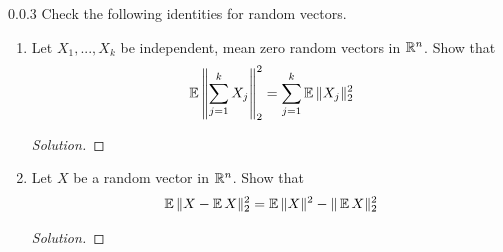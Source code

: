 \begin{ex}{0.0.3}\label{0.0.3} Check the following identities for random vectors.
\begin{enumerate}[label=(\alph*)]
\item Let $X_1,...,X_k$ be independent, mean zero random vectors in $\mathbb{R}^n$. Show that
\begin{align*}
    \operatorname{\mathbb{E}} \left\|\sum_{j=1}^k X_j\right\|_2^2 = \sum_{j=1}^k \operatorname{\mathbb{E}} \|X_j\|_2^2
\end{align*}
\begin{proof}[Solution]
\end{proof}

\item Let $X$ be a random vector in $\mathbb{R}^n$. Show that
\begin{align*}
    \operatorname{\mathbb{E}} \|X - \operatorname{\mathbb{E}} X\|_2^2 = \operatorname{\mathbb{E}}\|X\|^2 - \|\operatorname{\mathbb{E}} X \|^2_2
\end{align*}
\begin{proof}[Solution]
\end{proof}

\end{enumerate}
\end{ex}